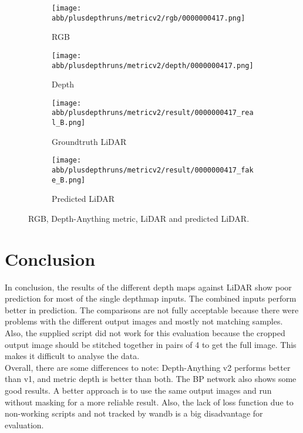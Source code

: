 \begin{figure}[!ht]
	\centering
	
	\begin{subfigure}{0.4\textwidth}
		\centering
		\texttt{[image: abb/plusdepthruns/metricv2/rgb/0000000417.png]}
		\caption{RGB}
		\label{fig:bild1}
	\end{subfigure}
	
	\vspace{1em} %
	
	\begin{subfigure}{0.4\textwidth}
		\centering
		\texttt{[image: abb/plusdepthruns/metricv2/depth/0000000417.png]}
		\caption{Depth}
		\label{fig:bild2}
	\end{subfigure}
	
	\vspace{1em} %
	
	\begin{subfigure}{0.25\textwidth}
		\centering
		\texttt{[image: abb/plusdepthruns/metricv2/result/0000000417\_real\_B.png]}
		\caption{Groundtruth LiDAR}
		\label{fig:bild3}
	\end{subfigure}
	\begin{subfigure}{0.25\textwidth}
		\centering
		\texttt{[image: abb/plusdepthruns/metricv2/result/0000000417\_fake\_B.png]}
		\caption{Predicted LiDAR}
		\label{fig:bild4}
	\end{subfigure}
	
	\caption{RGB, Depth-Anything metric, LiDAR and predicted LiDAR.}
	\label{metric_rgbd}
\end{figure}
\chapter{Conclusion}
In conclusion, the results of the different depth maps against LiDAR show poor prediction for most of the single depthmap inputs. The combined inputs perform better in prediction. The comparisons are not fully acceptable because there were problems with the different output images and mostly not matching samples. Also, the supplied script did not work for this evaluation because the cropped output image should be stitched together in pairs of 4 to get the full image. This makes it difficult to analyse the data. \newline \\Overall, there are some differences to note: Depth-Anything v2 performs better than v1, and metric depth is better than both. The BP network also shows some good results. A better approach is to use the same output images and run without masking for a more reliable result. Also, the lack of loss function due to non-working scripts and not tracked by wandb is a big disadvantage for evaluation. 
\newpage

